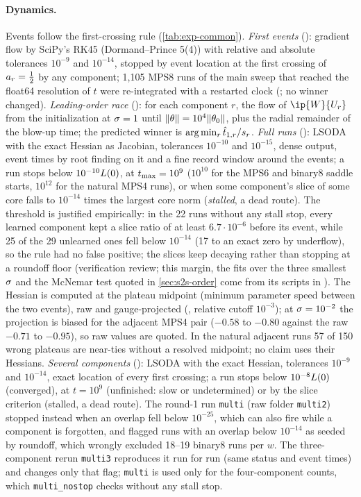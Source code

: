 \paragraph{Dynamics.}
Events follow the first-crossing rule (\cref{tab:exp-common}). \emph{First events} (): gradient flow by SciPy's RK45
(Dormand--Prince 5(4)) with relative and absolute tolerances $10^{-9}$ and $10^{-14}$, stopped by event location at
the first crossing of $a_{r}=\frac12$ by any component; 1,105 MPS8 runs of the main sweep that reached the float64 resolution of $t$ were re-integrated
with a restarted clock (; no winner changed). \emph{Leading-order race}
(): for each component $r$, the flow of $\ip{\W}{\U r}$ from the initialization at $\sigma=1$
until $\lVert\theta\rVert=10^4\lVert\theta_0\rVert$, plus the radial remainder of the blow-up time; the predicted winner is
$\arg\min_r\hat t_{1,r}/s_{r}$. \emph{Full runs} (): LSODA with the exact Hessian as Jacobian,
tolerances $10^{-10}$ and $10^{-15}$, dense output, event times by root finding on it and a fine record window
around the events; a run stops below $10^{-10}L(0)$, at $t_{\max}=10^9$ ($10^{10}$ for the MPS6 and binary8 saddle
starts, $10^{12}$ for the natural MPS4 runs), or when some component's slice of some core falls to $10^{-14}$ times
the largest core norm (\emph{stalled}, a dead route). The threshold is justified empirically: in the 22 runs without
any stall stop, every learned component kept a slice ratio of at least $6.7\cdot10^{-6}$ before its event, while 25
of the 29 unlearned ones fell below $10^{-14}$ (17 to an exact zero by underflow), so the rule had no false
positive; the slices keep decaying rather than stopping at a roundoff floor (verification review; this margin, the
fits over the three smallest $\sigma$ and the McNemar test quoted in \cref{sec:s2s-order} come from its scripts in
). The Hessian is computed at the
plateau midpoint (minimum parameter speed between the two events), raw and gauge-projected
(, relative cutoff $10^{-3}$); at $\sigma=10^{-2}$ the projection is biased for the adjacent MPS4
pair ($-0.58$ to $-0.80$ against the raw $-0.71$ to $-0.95$), so raw values are quoted. In the natural adjacent runs
57 of 150 wrong plateaus are near-ties without a resolved midpoint; no claim uses their Hessians.
\emph{Several components} (): LSODA with the exact Hessian, tolerances $10^{-9}$ and $10^{-14}$, exact
location of every first crossing; a run stops below $10^{-8}L(0)$ (converged), at $t=10^9$ (unfinished: slow or
undetermined) or by the slice criterion (stalled, a dead route). The round-1 run \texttt{multi} (raw folder \texttt{multi2}) stopped instead when an
overlap fell below $10^{-25}$, which can also fire while a component is forgotten, and flagged runs with an
overlap below $10^{-14}$ as seeded by roundoff, which wrongly excluded 18--19 binary8 runs per $w$. The
three-component rerun \texttt{multi3} reproduces it run for run (same status and event times) and changes only
that flag; \texttt{multi} is used only for the four-component counts, which \texttt{multi\_nostop} checks without any
stall stop.

